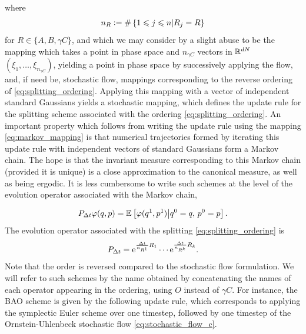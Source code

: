 where
$$n_R\mathrel{\mathop:}= \#\left\{1\leqslant j\leqslant n \middle| R_j=R\right\}$$
for $R\in\{A,B,\gamma C\}$, and which we may consider by a slight abuse to be the mapping which takes a point in phase space and $n_{\gamma C}$ vectors in $\mathbb{R}^{dN}$ $(\xi_1,\dots,\xi_{n_{\gamma C}})$, yielding a point in phase space by successively applying the flow, and, if need be, stochastic flow, mappings corresponding to the reverse ordering of \eqref{eq:splitting_ordering}.
Applying this mapping with a vector of independent standard Gaussians yields a stochastic mapping, which defines the update rule for the splitting scheme associated with the ordering \eqref{eq:splitting_ordering}.
An important property which follows from writing the update rule using the mapping \eqref{eq:markov_mapping} is that numerical trajectories formed by iterating this update rule with independent vectors of standard Gaussians form a Markov chain.
The hope is that the invariant measure corresponding to this Markov chain (provided it is unique) is a close approximation to the canonical measure, as well as being ergodic.
It is less cumbersome to write such schemes at the level of the evolution operator associated with the Markov chain,

\begin{equation}
    \label{eq:markov_evolution_operator}
    P_{\Delta t}\varphi (q,p) = \mathbb{E}\left[\varphi(q^1,p^1)\middle|q^0=q,\,p^0=p\right].
\end{equation}
The evolution operator associated with the splitting \eqref{eq:splitting_ordering} is
\begin{equation}
    \label{eq:splitting_semigroup_expr}
    P_{\Delta t}=\mathrm{e}^{\frac{{\Delta t}}{n_{R^1}}R_1}\dotsm\mathrm{e}^{\frac{{\Delta t}}{n_{R^k}}R_k}.
\end{equation}
Note that the order is reversed compared to the stochastic flow formulation.
We will refer to such schemes by the name obtained by concatenating the names of each operator appearing in the ordering, using $O$ instead of $\gamma C$.
For instance, the BAO scheme is given by the following update rule, which corresponds to applying the symplectic Euler scheme over one timestep, followed by one timestep of the Ornstein-Uhlenbeck stochastic flow \eqref{eq:stochastic_flow_c}.

